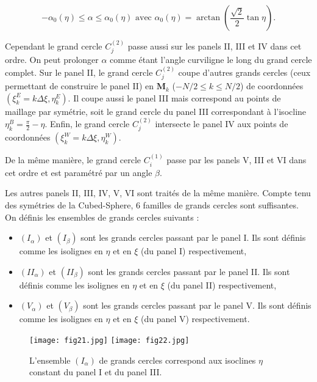 \begin{equation}
- \alpha_0 (\eta) \leq \alpha \leq \alpha_0(\eta) \text{ avec } \alpha_0( \eta) = \arctan \left( \dfrac{\sqrt{2}}{2} \tan \eta \right).
\end{equation}


Cependant le grand cercle $C_j^{(2)}$ passe aussi sur les panels II, III et IV dans cet ordre. On peut prolonger $\alpha$ comme étant l'angle curviligne le long du grand cercle complet. Sur le panel II, le grand cercle $C_j^{(2)}$ coupe d'autres grands cercles (ceux permettant de construire le panel II) en $\mathbf{M}_k$ ($-N/2 \leq k \leq N/2$) de coordonnées $(\xi^E_k = k \Delta \xi, \eta^E_k)$. Il coupe aussi le panel III mais correspond au points de maillage par symétrie, soit le grand cercle du panel III correspondant à l'isocline $\eta^B_k = \frac{\pi}{2} - \eta$. Enfin, le grand cercle $C_j^{(2)}$ intersecte le panel IV aux points de coordonnées $(\xi^W_k = k \Delta \xi, \eta^W_k)$. 

De la même manière, le grand cercle $C_i^{(1)}$ passe par les panels V, III et VI dans cet ordre et est paramétré par un angle $\beta$.

Les autres panels II, III, IV, V, VI sont traités de la même manière. Compte tenu des symétries de la Cubed-Sphere, 6 familles de grands cercles sont suffisantes. On définis les ensembles de grands cercles suivants :

\begin{itemize}
\item $(I_{\alpha})$ et $(I_{\beta})$ sont les grands cercles passant par le panel I. Ils sont définis comme les isolignes en $\eta$ et en $\xi$ (du panel I) respectivement,
\item $(II_{\alpha})$ et $(II_{\beta})$ sont les grands cercles passant par le panel II. Ils sont définis comme les isolignes en $\eta$ et en $\xi$ (du panel II) respectivement,
\item $(V_{\alpha})$ et $(V_{\beta})$ sont les grands cercles passant par le panel V. Ils sont définis comme les isolignes en $\eta$ et en $\xi$ (du panel V) respectivement.
\end{itemize}

\begin{figure}
\begin{center}
\texttt{[image: fig21.jpg]}
\texttt{[image: fig22.jpg]}
\end{center}
\caption{L'ensemble $(I_{\alpha})$ de grands cercles correspond aux isoclines $\eta$ constant du panel I et du panel III.}
\end{figure}


